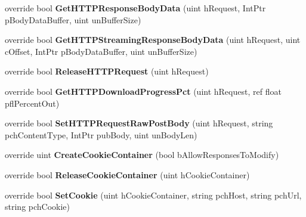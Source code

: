 \begin{DoxyCompactItemize}
override bool {\bfseries Get\+H\+T\+T\+P\+Response\+Body\+Data} (uint h\+Request, Int\+Ptr p\+Body\+Data\+Buffer, uint un\+Buffer\+Size)
\item 
\mbox{\label{class_valve_1_1_steamworks_1_1_c_steam_h_t_t_p_aa84af3be1230d4b6b89cf7e1b391b101}} 
override bool {\bfseries Get\+H\+T\+T\+P\+Streaming\+Response\+Body\+Data} (uint h\+Request, uint c\+Offset, Int\+Ptr p\+Body\+Data\+Buffer, uint un\+Buffer\+Size)
\item 
\mbox{\label{class_valve_1_1_steamworks_1_1_c_steam_h_t_t_p_a4be96a6c3fdf40a0546dacee1122cd22}} 
override bool {\bfseries Release\+H\+T\+T\+P\+Request} (uint h\+Request)
\item 
\mbox{\label{class_valve_1_1_steamworks_1_1_c_steam_h_t_t_p_a2d8f5c51eda98d14972c1d92882fb64c}} 
override bool {\bfseries Get\+H\+T\+T\+P\+Download\+Progress\+Pct} (uint h\+Request, ref float pfl\+Percent\+Out)
\item 
\mbox{\label{class_valve_1_1_steamworks_1_1_c_steam_h_t_t_p_a9188a5263563fc91f30b6d7bbc168426}} 
override bool {\bfseries Set\+H\+T\+T\+P\+Request\+Raw\+Post\+Body} (uint h\+Request, string pch\+Content\+Type, Int\+Ptr pub\+Body, uint un\+Body\+Len)
\item 
\mbox{\label{class_valve_1_1_steamworks_1_1_c_steam_h_t_t_p_a8f284429ef15cf27889d42e43b9a6c77}} 
override uint {\bfseries Create\+Cookie\+Container} (bool b\+Allow\+Responses\+To\+Modify)
\item 
\mbox{\label{class_valve_1_1_steamworks_1_1_c_steam_h_t_t_p_aa47aff8b337f5b09d24a7d2a85c3f4c0}} 
override bool {\bfseries Release\+Cookie\+Container} (uint h\+Cookie\+Container)
\item 
\mbox{\label{class_valve_1_1_steamworks_1_1_c_steam_h_t_t_p_af3023a92df3c8158e10241eac4e7f388}} 
override bool {\bfseries Set\+Cookie} (uint h\+Cookie\+Container, string pch\+Host, string pch\+Url, string pch\+Cookie)

\end{DoxyCompactItemize}
